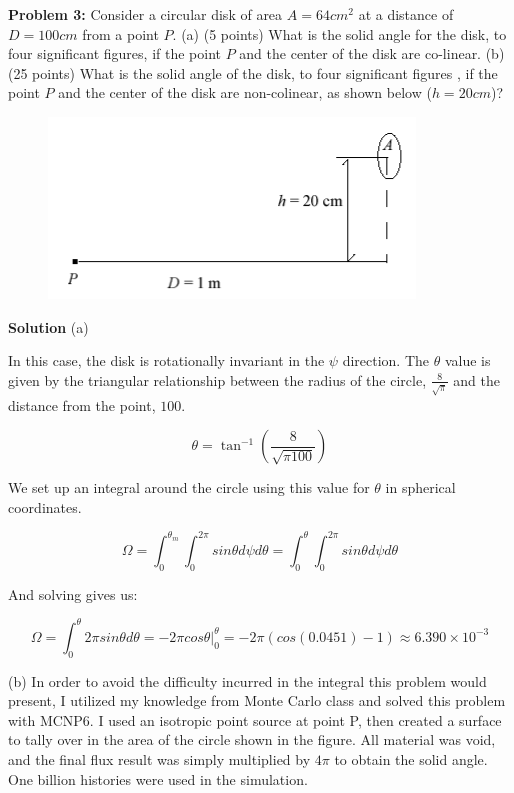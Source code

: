 \documentclass{amsart}
\theoremstyle{definition}
\begin{document}
\newpage
\textbf{Problem 3:} Consider a circular disk of area $A=64 cm^2$ at a distance of $D=100 cm$ from a point $P$. \newline
(a) (5 points) What is the solid angle for the disk, to four significant figures, if the point $P$ and the center of the disk are co-linear. \newline
(b) (25 points) What is the solid angle of the disk, to four significant figures , if the point $P$ and the center of the disk are non-colinear, as shown below ($h=20 cm$)? \newline
\begin{figure}[h!]
                \includegraphics[width=0.6\linewidth]{HW1_Problem3.png}
\end{figure}
\bigbreak
\textbf{Solution}
\bigbreak
(a)

In this case, the disk is rotationally invariant in the $\psi$ direction.
The $\theta$ value is given by the triangular relationship between the radius of the circle, $\frac{8}{\sqrt{\pi}}$ and the distance from the point, $100$.

$$ \theta = \tan^{-1}(\frac{8}{\sqrt{\pi 100}}) $$

We set up an integral around the circle using this value for $\theta$ in spherical coordinates.

$$ \Omega = \int_0^{\theta_m} \int_0^{2\pi} sin \theta d \psi d\theta = \int_0^{\theta} \int_0^{2\pi} sin \theta d \psi d\theta $$

And solving gives us:

$$ \Omega = \int_0^{\theta} 2 \pi sin \theta d \theta = -2 \pi cos \theta \bigg|_0^{\theta} = -2 \pi ( cos(0.0451) - 1) \approx \boxed{6.390 \times 10^{-3}} $$


(b)
In order to avoid the difficulty incurred in the integral this problem would present, I utilized my knowledge from Monte Carlo class and solved this problem with MCNP6.
I used an isotropic point source at point P, then created a surface to tally over in the area of the circle shown in the figure.
All material was void, and the final flux result was simply multiplied by $4 \pi$ to obtain the solid angle.
One billion histories were used in the simulation.
\end{document}
